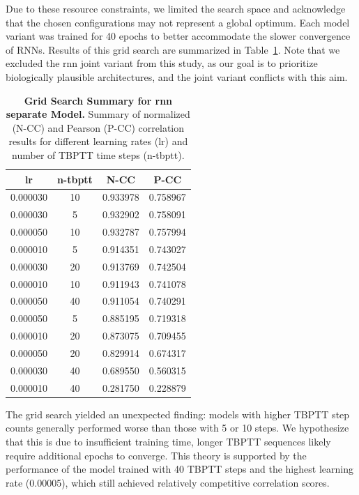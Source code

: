Due to these resource constraints, we limited the search space and acknowledge that the chosen configurations may not represent a global optimum. Each model variant was trained for 40 epochs to better accommodate the slower convergence of RNNs. Results of this grid search are summarized in Table~\ref{tab:grid_rnn_separate}. Note that we excluded the rnn joint variant from this study, as our goal is to prioritize biologically plausible architectures, and the joint variant conflicts with this aim.

\begin{table}
    \centering\footnotesize\sf
    \begin{tabular}{cccc}
    \toprule
    lr & n-tbptt & N-CC & P-CC \\
    \midrule
    0.000030 & 10 & 0.933978 & 0.758967 \\
    0.000030 & 5 & 0.932902 & 0.758091 \\
    0.000050 & 10 & 0.932787 & 0.757994 \\
    0.000010 & 5 & 0.914351 & 0.743027 \\
    0.000030 & 20 & 0.913769 & 0.742504 \\
    0.000010 & 10 & 0.911943 & 0.741078 \\
    0.000050 & 40 & 0.911054 & 0.740291 \\
    0.000050 & 5 & 0.885195 & 0.719318 \\
    0.000010 & 20 & 0.873075 & 0.709455 \\
    0.000050 & 20 & 0.829914 & 0.674317 \\
    0.000030 & 40 & 0.689550 & 0.560315 \\
    0.000010 & 40 & 0.281750 & 0.228879 \\
    \bottomrule
    \end{tabular}
    \caption{\textbf{Grid Search Summary for rnn separate Model.} Summary of normalized (N-CC) and Pearson (P-CC) correlation results for different learning rates (lr) and number of TBPTT time steps (n-tbptt).}
    \label{tab:grid_rnn_separate}
\end{table}

The grid search yielded an unexpected finding: models with higher TBPTT step counts generally performed worse than those with 5 or 10 steps. We hypothesize that this is due to insufficient training time, longer TBPTT sequences likely require additional epochs to converge. This theory is supported by the performance of the model trained with 40 TBPTT steps and the highest learning rate (0.00005), which still achieved relatively competitive correlation scores.

